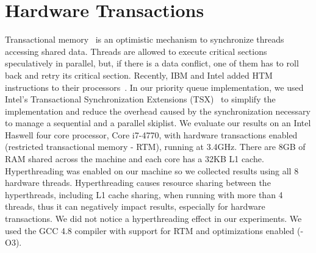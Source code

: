 \section{Hardware Transactions}
\label{Sec-HardwareTransactions}


Transactional memory~\cite{Herlihy:1993:TMA:173682.165164} is an optimistic mechanism to synchronize threads accessing shared data. Threads are allowed to execute critical sections speculatively in parallel, but, if there is a data conflict, one of them has to roll back and retry its critical section. Recently, IBM and Intel added HTM instructions to their processors~\cite{wang:2012:pact,haswell:2012:rtm}. 
In our priority queue implementation, we used Intel's Transactional Synchronization Extensions (TSX)~\cite{haswell:2012:rtm} to simplify the implementation and reduce the overhead caused by the synchronization necessary to manage a sequential and a parallel skiplist. 
We evaluate our results on an Intel Haswell four core processor, Core i7-4770, with hardware transactions enabled (restricted transactional memory - RTM), running at 3.4GHz. There are 8GB of RAM shared across the machine and each core has a 32KB L1 cache. Hyperthreading was enabled on our machine so we collected results using all 8 hardware threads. Hyperthreading causes resource sharing between the hyperthreads, including L1 cache sharing, when running with more than 4 threads, thus it can negatively impact results, especially for hardware transactions. We did not notice a hyperthreading effect in our experiments. We used the GCC 4.8 compiler with support for RTM and optimizations enabled (-O3).  
